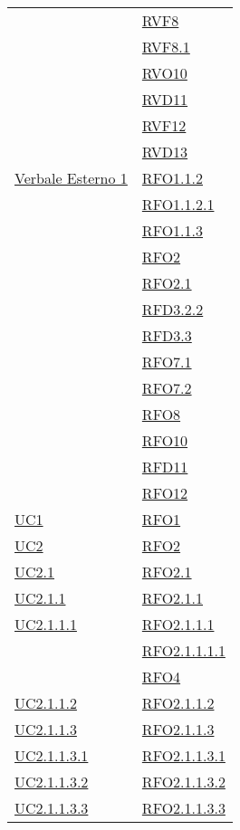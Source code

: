 \begin{longtable}{|>{\centering}m{5cm}|m{5cm}<{\centering}|}
& \hyperlink{RVF8}{RVF8}\\
& \hyperlink{RVF8.1}{RVF8.1}\\
& \hyperlink{RVO10}{RVO10}\\
& \hyperlink{RVD11}{RVD11}\\
& \hyperlink{RVF12}{RVF12}\\
& \hyperlink{RVD13}{RVD13}\\ \hline
\hyperlink{Verbale Esterno 1}{Verbale Esterno 1} & \hyperlink{RFO1.1.2}{RFO1.1.2}\\
& \hyperlink{RFO1.1.2.1}{RFO1.1.2.1}\\
& \hyperlink{RFO1.1.3}{RFO1.1.3}\\
& \hyperlink{RFO2}{RFO2}\\
& \hyperlink{RFO2.1}{RFO2.1}\\
& \hyperlink{RFD3.2.2}{RFD3.2.2}\\
& \hyperlink{RFD3.3}{RFD3.3}\\
& \hyperlink{RFO7.1}{RFO7.1}\\
& \hyperlink{RFO7.2}{RFO7.2}\\
& \hyperlink{RFO8}{RFO8}\\
& \hyperlink{RFO10}{RFO10}\\
& \hyperlink{RFD11}{RFD11}\\
& \hyperlink{RFO12}{RFO12}\\ \hline
\hyperref[UC1]{UC1} & \hyperlink{RFO1}{RFO1}\\ \hline
\hyperref[UC2]{UC2} & \hyperlink{RFO2}{RFO2}\\ \hline
\hyperref[UC2.1]{UC2.1} & \hyperlink{RFO2.1}{RFO2.1}\\ \hline
\hyperref[UC2.1.1]{UC2.1.1} & \hyperlink{RFO2.1.1}{RFO2.1.1}\\ \hline
\hyperref[UC2.1.1.1]{UC2.1.1.1} & \hyperlink{RFO2.1.1.1}{RFO2.1.1.1}\\
& \hyperlink{RFO2.1.1.1.1}{RFO2.1.1.1.1}\\
& \hyperlink{RFO4}{RFO4}\\ \hline
\hyperref[UC2.1.1.2]{UC2.1.1.2} & \hyperlink{RFO2.1.1.2}{RFO2.1.1.2}\\ \hline
\hyperref[UC2.1.1.3]{UC2.1.1.3} & \hyperlink{RFO2.1.1.3}{RFO2.1.1.3}\\ \hline
\hyperref[UC2.1.1.3.1]{UC2.1.1.3.1} & \hyperlink{RFO2.1.1.3.1}{RFO2.1.1.3.1}\\ \hline
\hyperref[UC2.1.1.3.2]{UC2.1.1.3.2} & \hyperlink{RFO2.1.1.3.2}{RFO2.1.1.3.2}\\ \hline
\hyperref[UC2.1.1.3.3]{UC2.1.1.3.3} & \hyperlink{RFO2.1.1.3.3}{RFO2.1.1.3.3}\\ \hline

\end{longtable}
